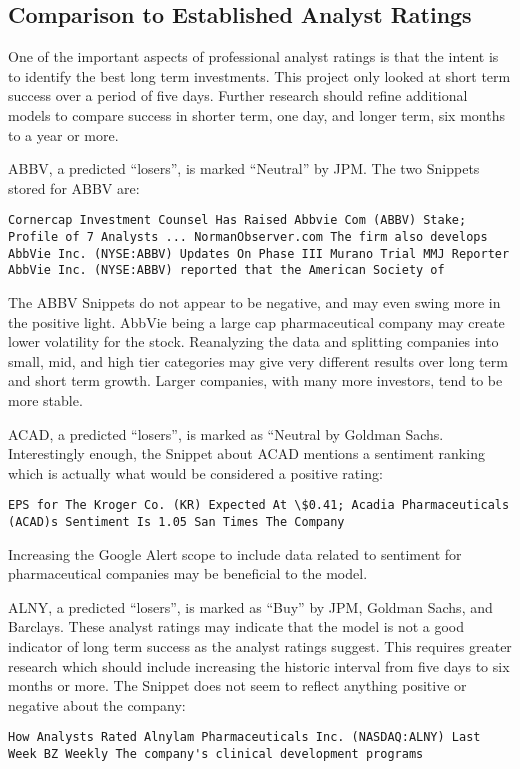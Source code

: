 \documentclass[sigconf]{acmart}
\begin{document}
\subsection{Comparison to Established Analyst Ratings}
One of the important aspects of professional analyst ratings is that the intent is to identify the best long term investments. This project only looked at short term success over a period of five days. Further research should refine additional models to compare success in shorter term, one day, and longer term, six months to a year or more.

ABBV, a predicted ``losers'', is marked ``Neutral'' by JPM. The two Snippets stored for ABBV are:
\begin{lstlisting}
Cornercap Investment Counsel Has Raised Abbvie Com (ABBV) Stake; Profile of 7 Analysts ... NormanObserver.com The firm also develops
AbbVie Inc. (NYSE:ABBV) Updates On Phase III Murano Trial MMJ Reporter AbbVie Inc. (NYSE:ABBV) reported that the American Society of
\end{lstlisting}
The ABBV Snippets do not appear to be negative, and may even swing more in the positive light. AbbVie being a large cap pharmaceutical company may create lower volatility for the stock. Reanalyzing the data and splitting companies into small, mid, and high tier categories may give very different results over long term and short term growth. Larger companies, with many more investors, tend to be more stable.

ACAD, a predicted ``losers'', is marked as ``Neutral by Goldman Sachs. Interestingly enough, the Snippet about ACAD mentions a sentiment ranking which is actually what would be considered a positive rating:
\begin{lstlisting}
EPS for The Kroger Co. (KR) Expected At \$0.41; Acadia Pharmaceuticals (ACAD)s Sentiment Is 1.05 San Times The Company
\end{lstlisting}
 Increasing the Google Alert scope to include data related to sentiment for pharmaceutical companies may be beneficial to the model.

ALNY, a predicted ``losers'', is marked as ``Buy'' by JPM, Goldman Sachs, and Barclays. These analyst ratings may indicate that the model is not a good indicator of long term success as the analyst ratings suggest. This requires greater research which should include increasing the historic interval from five days to six months or more. The Snippet does not seem to reflect anything positive or negative about the company:
\begin{lstlisting}
How Analysts Rated Alnylam Pharmaceuticals Inc. (NASDAQ:ALNY) Last Week BZ Weekly The company's clinical development programs
\end{lstlisting}
\end{document}
